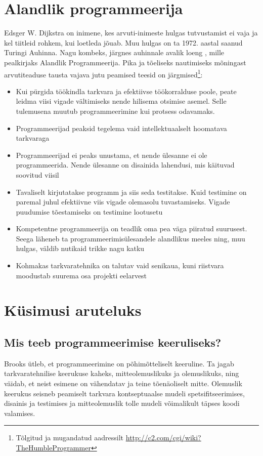 \section{Alandlik programmeerija}
\label{humble}
Edsger W. Dijkstra on inimene, kes arvuti-inimeste hulgas tutvustamist ei vaja ja kel tiitleid rohkem, kui loetleda jõuab. Muu hulgas on ta 1972. aastal saanud Turingi Auhinna. Nagu kombeks, järgnes auhinnale avalik loeng \citep{yourdon1979classics}, mille pealkirjaks Alandlik Programmeerija. Pika ja tõeliseks nautimiseks mõningast arvutiteaduse tausta vajava jutu peamised teesid on järgmised\footnote{Tõlgitud ja mugandatud aadressilt \url{http://c2.com/cgi/wiki?TheHumbleProgrammer}}:
\begin{itemize}
	\item Kui pürgida töökindla tarkvara ja efektiivse töökorralduse poole, peate leidma viisi vigade vältimiseks nende hilisema otsimise asemel. Selle tulemusena muutub programmeerimine kui protsess odavamaks.
	\item Programmeerijad peaksid tegelema vaid intellektuaalselt hoomatava tarkvaraga
	\item Programmeerijad ei peaks unustama, et nende ülesanne ei ole programmeerida. Nende ülesanne on disainida lahendusi, mis käituvad soovitud viisil
	\item Tavaliselt kirjutatakse programm ja siis seda testitakse. Kuid testimine on paremal juhul efektiivne viis vigade olemasolu tuvastamiseks. Vigade puudumise  tõestamiseks on testimine lootusetu
	\item Kompetentne programmeerija on teadlik oma pea väga piiratud suurusest. Seega läheneb ta programmeerimisülesandele alandlikus meeles ning, muu hulgas, väldib nutikaid trikke nagu katku
	\item Kohmakas tarkvaratehnika on talutav vaid senikaua, kuni riistvara moodustab suurema osa projekti eelarvest
\end{itemize}

\section{Küsimusi aruteluks}
\subsection{Mis teeb programmeerimise keeruliseks?}

Brooks ütleb, et programmeerimine on põhimõtteliselt keeruline\cite{brooks1975mythical}. Ta jagab tarkvaratehnilise keerukuse kaheks, mitteolemuslikuks ja olemuslikuks, ning väidab, et neist esimene on vähendatav ja teine tõenäoliselt mitte. Olemuslik keerukus seisneb peamiselt tarkvara kontseptuaalse mudeli spetsifitseerimises, disainis ja testimises ja mitteolemuslik tolle mudeli võimalikult täpses koodi valamises. 

